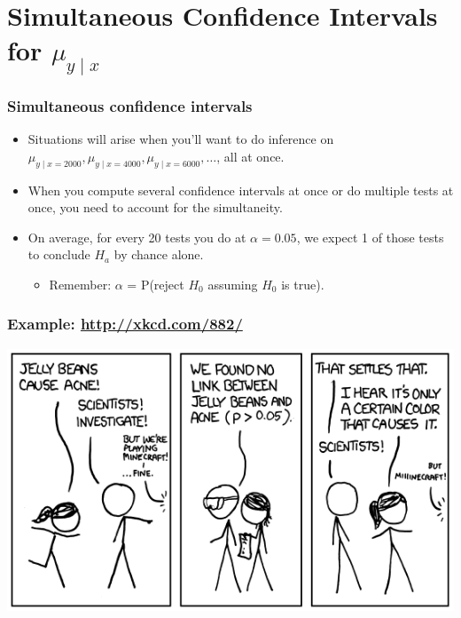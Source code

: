 \documentclass[handout]{beamer}\usepackage{graphicx, color}
\numberwithin{equation}{section}
\begin{document}
\section{Simultaneous Confidence Intervals for $\mu_{y \mid x}$}

\begin{frame}
\frametitle{Simultaneous confidence intervals}
\begin{itemize}
\item Situations will arise when you'll want to do inference on $\mu_{y \mid x = 2000}, \mu_{y \mid x = 4000}, \mu_{y \mid x = 6000}, \ldots$, all at once.
\pause \item When you compute several confidence intervals at once or do multiple tests at once, you need to account for the simultaneity.
\pause \item On average, for every 20 tests you do at $\alpha = 0.05$,  we expect 1 of those tests to conclude $H_a$ by chance alone.
\begin{itemize}
\pause \item Remember: $\alpha$ = P(reject $H_0$ assuming $H_0$ is true).
\end{itemize}
\end{itemize}
\end{frame}


\begin{frame}
\frametitle{Example: \url{http://xkcd.com/882/}}
 \includegraphics{../../fig/xkcd1.png}
\end{frame}
\end{document}
